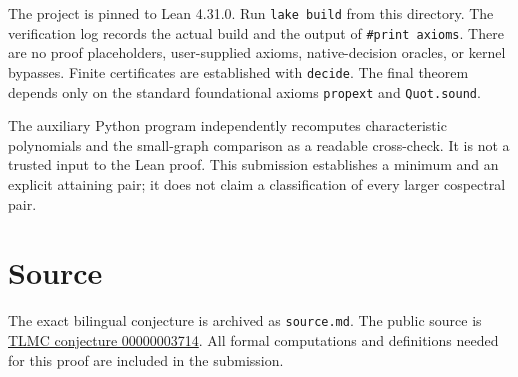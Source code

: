 \documentclass[10pt]{article}
\begin{document}
The project is pinned to Lean 4.31.0. Run \texttt{lake build} from this directory. The verification log records the actual build and the output of \texttt{\#print axioms}. There are no proof placeholders, user-supplied axioms, native-decision oracles, or kernel bypasses. Finite certificates are established with \texttt{decide}. The final theorem depends only on the standard foundational axioms \texttt{propext} and \texttt{Quot.sound}.

The auxiliary Python program independently recomputes characteristic polynomials and the small-graph comparison as a readable cross-check. It is not a trusted input to the Lean proof. This submission establishes a minimum and an explicit attaining pair; it does not claim a classification of every larger cospectral pair.
\section{Source}
The exact bilingual conjecture is archived as \texttt{source.md}. The public source is \href{https://github.com/The-Last-Math-Competition/The-Last-Math-Competition/blob/main/conjectures/00000003714.md}{TLMC conjecture 00000003714}. All formal computations and definitions needed for this proof are included in the submission.
\end{document}
